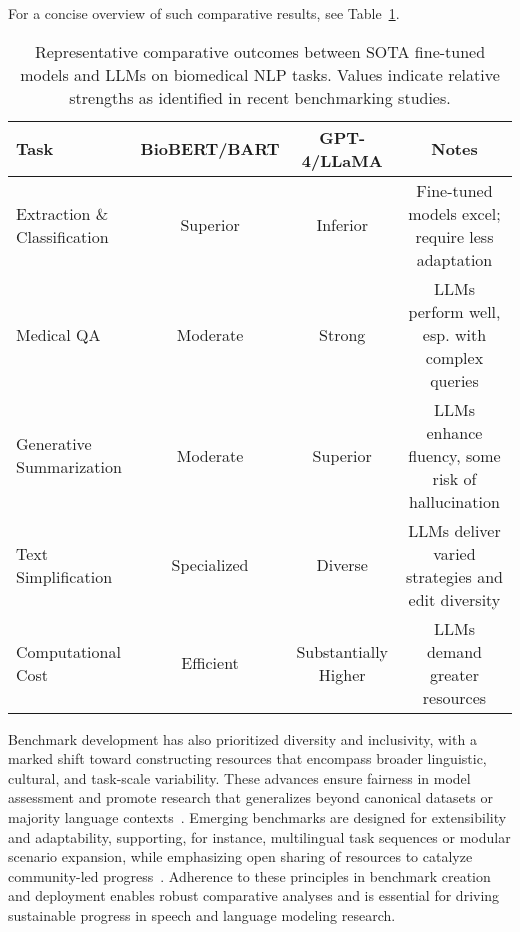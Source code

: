 \documentclass[11pt]{article}
\begin{document}
For a concise overview of such comparative results, see Table~\ref{tab:method_comparison}.

\begin{table}[!ht]
    \centering
    \caption{Representative comparative outcomes between SOTA fine-tuned models and LLMs on biomedical NLP tasks. Values indicate relative strengths as identified in recent benchmarking studies.}
    \label{tab:method_comparison}
    \begin{tabular}{lccc}
        \toprule
        \textbf{Task} & \textbf{BioBERT/BART} & \textbf{GPT-4/LLaMA} & \textbf{Notes} \\
        \midrule
        Extraction \& Classification    & Superior         & Inferior          & Fine-tuned models excel; require less adaptation \\
        Medical QA                     & Moderate         & Strong            & LLMs perform well, esp. with complex queries \\
        Generative Summarization       & Moderate         & Superior          & LLMs enhance fluency, some risk of hallucination \\
        Text Simplification            & Specialized      & Diverse           & LLMs deliver varied strategies and edit diversity \\
        Computational Cost             & Efficient        & Substantially Higher & LLMs demand greater resources \\
        \bottomrule
    \end{tabular}
\end{table}

Benchmark development has also prioritized diversity and inclusivity, with a marked shift toward constructing resources that encompass broader linguistic, cultural, and task-scale variability. These advances ensure fairness in model assessment and promote research that generalizes beyond canonical datasets or majority language contexts~\cite{ref:106}. Emerging benchmarks are designed for extensibility and adaptability, supporting, for instance, multilingual task sequences or modular scenario expansion, while emphasizing open sharing of resources to catalyze community-led progress~\cite{ref:102,ref:104,ref:106}. Adherence to these principles in benchmark creation and deployment enables robust comparative analyses and is essential for driving sustainable progress in speech and language modeling research.
\end{document}

